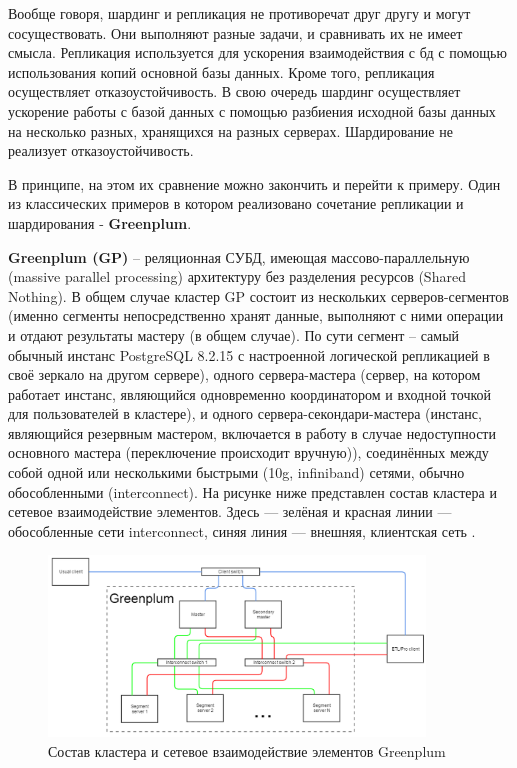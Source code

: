 Вообще говоря, шардинг и репликация не противоречат друг другу и могут сосуществовать. Они выполняют разные задачи, и
сравнивать их не имеет смысла. Репликация используется для ускорения взаимодействия с бд с помощью использования копий
основной базы данных. Кроме того, репликация осуществляет отказоустойчивость. В свою очередь шардинг осуществляет
ускорение работы с базой данных с помощью разбиения исходной базы данных на несколько разных, хранящихся на разных
серверах.  Шардирование не реализует отказоустойчивость.

В принципе, на этом их сравнение можно закончить и перейти к примеру. Один из классических примеров в котором
реализовано сочетание репликации и шардирования - \textbf{Greenplum}.

\textbf{Greenplum (GP)} – реляционная СУБД, имеющая массово-параллельную (massive parallel processing) архитектуру без
разделения ресурсов (Shared Nothing). В общем случае кластер GP состоит из нескольких серверов-сегментов (именно
сегменты непосредственно хранят данные, выполняют с ними операции и отдают результаты мастеру (в общем случае). По сути
сегмент – самый обычный инстанс PostgreSQL 8.2.15 с настроенной логической репликацией в своё зеркало на другом
сервере), одного сервера-мастера (сервер, на котором работает инстанс, являющийся одновременно координатором и входной
точкой для пользователей в кластере), и одного сервера-секондари-мастера (инстанс, являющийся резервным мастером,
включается в работу в случае недоступности основного мастера (переключение происходит вручную)), соединённых между
собой одной или несколькими быстрыми (10g, infiniband) сетями, обычно обособленными (interconnect). На рисунке ниже
представлен состав кластера и сетевое взаимодействие элементов. Здесь — зелёная и красная линии — обособленные сети
interconnect, синяя линия — внешняя, клиентская сеть \autocite{Greenplum}.

\begin{figure}[H]
    \centering
    \includegraphics[width=100mm]{assets/distributed/Greenplum}
    \caption{Состав кластера и сетевое взаимодействие элементов Greenplum}
    \label{fig:Greenplum}
\end{figure}

